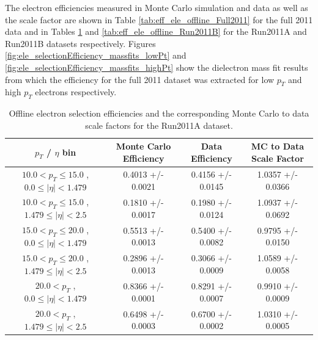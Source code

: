\label{app:efficiency_studies_electron}

The electron efficiencies measured in Monte Carlo simulation and data as well as the scale 
factor are shown in Table \ref{tab:eff_ele_offline_Full2011} for the full 2011 data and in Tables 
\ref{tab:eff_ele_offline_Run2011A} and \ref{tab:eff_ele_offline_Run2011B} for 
the Run2011A and Run2011B datasets respectively. Figures \ref{fig:ele_selectionEfficiency_massfits_lowPt}
and \ref{fig:ele_selectionEfficiency_massfits_highPt} show the dielectron mass fit 
results from which the efficiency for the full 2011 dataset was extracted for
low $p_{T}$ and high $p_{T}$ electrons respectively.


 \begin{table}[!ht]
 \begin{center} 
 \begin{tabular}{|c|c|c|c|}
 \hline
 $p_{T}$ / $\eta$ bin    &  Monte Carlo Efficiency    &  Data Efficiency   &  MC to Data Scale Factor \\   \hline           
$ 10.0 < p_{T} \le  15.0$ , $  0.0  \le |\eta| <   1.479$   &       0.4013 +/- 0.0021   &       0.4156 +/- 0.0145   &       1.0357 +/- 0.0366   \\   
\hline
$ 10.0 < p_{T} \le  15.0$ , $  1.479  \le |\eta| <   2.5$   &       0.1810 +/- 0.0017   &       0.1980 +/- 0.0124   &       1.0937 +/- 0.0692   \\   
\hline
$ 15.0 < p_{T} \le  20.0$ , $  0.0  \le |\eta| <   1.479$   &       0.5513 +/- 0.0013   &       0.5400 +/- 0.0082   &       0.9795 +/- 0.0150   \\   
\hline
$ 15.0 < p_{T} \le  20.0$ , $  1.479  \le |\eta| <   2.5$   &       0.2896 +/- 0.0013   &       0.3066 +/- 0.0009   &       1.0589 +/- 0.0058   \\   
\hline
$ 20.0 < p_{T} $ , $  0.0  \le |\eta| <   1.479$   &       0.8366 +/- 0.0001   &       0.8291 +/- 0.0007   &       0.9910 +/- 0.0009   \\   
\hline
$ 20.0 < p_{T} $ , $  1.479  \le |\eta| <   2.5$   &       0.6498 +/- 0.0003   &       0.6700 +/- 0.0002   &       1.0310 +/- 0.0005   \\   
\hline
\end{tabular}
\caption{Offline electron selection efficiencies and the corresponding Monte Carlo to data scale factors for the
Run2011A dataset.}
\label{tab:eff_ele_offline_Run2011A}
\end{center}
\end{table}


